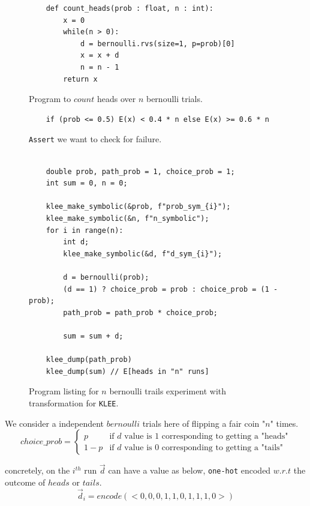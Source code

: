 \documentclass[usenames,dvipsnames,acmsmall]{acmart}
\begin{document}
	\begin{figure}
		\begin{verbatim}
	def count_heads(prob : float, n : int):
		x = 0
		while(n > 0):
			d = bernoulli.rvs(size=1, p=prob)[0]
			x = x + d
			n = n - 1
		return x
		\end{verbatim}
	\caption{Program to $count$ heads over $n$ bernoulli trials.}
	\end{figure}
	\begin{figure}
		\begin{verbatim}
	if (prob <= 0.5) E(x) < 0.4 * n else E(x) >= 0.6 * n
		\end{verbatim}
	\caption{\texttt{Assert} we want to check for failure.}
	\end{figure}
	\begin{figure}
		\begin{verbatim}
	
	double prob, path_prob = 1, choice_prob = 1;
	int sum = 0, n = 0;
	
	klee_make_symbolic(&prob, f"prob_sym_{i}");
	klee_make_symbolic(&n, f"n_symbolic");
	for i in range(n):
		int d;
		klee_make_symbolic(&d, f"d_sym_{i}");
	
		d = bernoulli(prob);
		(d == 1) ? choice_prob = prob : choice_prob = (1 - prob);
		path_prob = path_prob * choice_prob;
		
		sum = sum + d;
		
	klee_dump(path_prob)
	klee_dump(sum) // E[heads in "n" runs] 
		\end{verbatim}
		\caption{Program listing for $n$ bernoulli trails experiment with transformation for \texttt{KLEE}.}
	\end{figure}

We consider a independent $bernoulli$ trials here of flipping a fair coin "$n$" times. 
\[ 
{choice\_prob} = 
\begin{cases} 
	p & \textrm{if $d$ value is 1 corresponding to getting a "heads"} \\
	1-p & \textrm{if $d$ value is 0 corresponding to getting a "tails"}
\end{cases}
\]

concretely, on the $i^{th}$ run \texttt{$\vec{d}$} can have a value as below, \texttt{one-hot} encoded $w.r.t$ the outcome of $heads$ or $tails$.
\[
\vec{d}_{i} = encode(<0,0,0,1,1,0,1,1,1,0>)
\]
\end{document}
